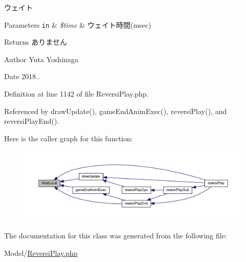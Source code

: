 ウェイト 


\begin{DoxyParams}[1]{Parameters}
\mbox{\tt in}  & {\em \$time} & ウェイト時間(msec) \\
\hline
\end{DoxyParams}
\begin{DoxyReturn}{Returns}
ありません 
\end{DoxyReturn}
\begin{DoxyAuthor}{Author}
Yuta Yoshinaga 
\end{DoxyAuthor}
\begin{DoxyDate}{Date}
2018.. 
\end{DoxyDate}


Definition at line 1142 of file Reversi\+Play.\+php.



Referenced by draw\+Update(), game\+End\+Anim\+Exec(), reversi\+Play(), and reversi\+Play\+End().

Here is the caller graph for this function\+:
\nopagebreak
\begin{figure}[H]
\begin{center}
\leavevmode
\includegraphics[width=350pt]{class_reversi_play_a58884d8de55d9faeac653fcf6d4f48b3_icgraph}
\end{center}
\end{figure}


The documentation for this class was generated from the following file\+:\begin{DoxyCompactItemize}
\item 
Model/\hyperlink{_reversi_play_8php}{Reversi\+Play.\+php}\end{DoxyCompactItemize}
